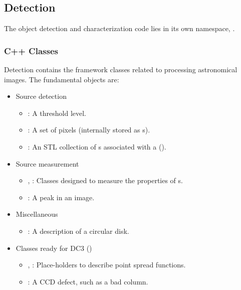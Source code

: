 
\subsection{Detection}
\label{Detection}

The object detection and characterization code lies in its own namespace, .

\subsubsection{C++ Classes}

Detection contains the framework classes related to processing astronomical images.
The fundamental objects are:
\begin{itemize}
\item Source detection
  \begin{itemize}
  \item {}:
    A threshold level.
  \item {}:
    A set of pixels (internally stored as s).
  \item {}:
    An STL collection of s associated
    with a  ().
  \end{itemize}
  
\item Source measurement
  \begin{itemize}
  \item {}, :
    Classes designed to measure the properties
    of s.
  \item {}:
    A peak in an image.
  \end{itemize}
  
\item Miscellaneous
  \begin{itemize}
  \item {}:
    A description of a circular disk.
  \end{itemize}
  
\item Classes ready for DC3 ()
  \begin{itemize}
  \item {}, :
    Place-holders to describe point spread functions.
  \item {}:
    A CCD defect, such as a bad column.
  \end{itemize}
\end{itemize}

